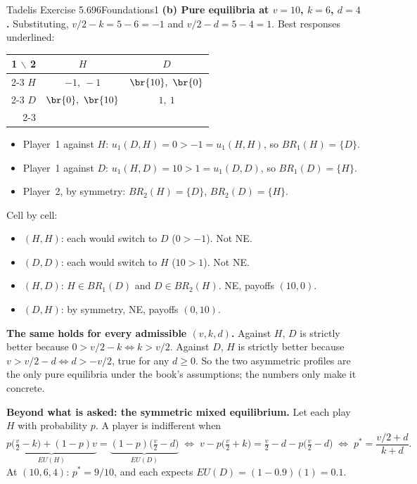 \begin{exsol}{Tadelis Exercise 5.6}{96}{Foundations}{1}
\textbf{(b) Pure equilibria at $v = 10$, $k = 6$, $d = 4$.} Substituting,
$v/2 - k = 5 - 6 = -1$ and $v/2 - d = 5 - 4 = 1$. Best responses underlined:
\begin{center}
\begin{tabular}{r|c|c|}
\multicolumn{1}{r}{1 $\backslash$ 2} & \multicolumn{1}{c}{$H$} & \multicolumn{1}{c}{$D$}\\ \cline{2-3}
$H$ & $-1,\ -1$ & $\br{10},\ \br{0}$ \\ \cline{2-3}
$D$ & $\br{0},\ \br{10}$ & $1,\ 1$ \\ \cline{2-3}
\end{tabular}
\end{center}
\begin{itemize}
  \item Player~1 against $H$: $u_1(D,H) = 0 > -1 = u_1(H,H)$, so $BR_1(H) = \{D\}$.
  \item Player~1 against $D$: $u_1(H,D) = 10 > 1 = u_1(D,D)$, so $BR_1(D) = \{H\}$.
  \item Player~2, by symmetry: $BR_2(H) = \{D\}$, $BR_2(D) = \{H\}$.
\end{itemize}
Cell by cell:
\begin{itemize}
  \item $(H,H)$: each would switch to $D$ ($0 > -1$). Not NE.
  \item $(D,D)$: each would switch to $H$ ($10 > 1$). Not NE.
  \item $(H,D)$: $H \in BR_1(D)$ and $D \in BR_2(H)$. NE, payoffs $(10, 0)$.
  \item $(D,H)$: by symmetry, NE, payoffs $(0, 10)$.
\end{itemize}

\textbf{The same holds for every admissible $(v,k,d)$.} Against $H$, $D$ is strictly better because
$0 > v/2 - k \iff k > v/2$. Against $D$, $H$ is strictly better because
$v > v/2 - d \iff d > -v/2$, true for any $d \ge 0$. So the two asymmetric profiles are the only
pure equilibria under the book's assumptions; the numbers only make it concrete.

\textbf{Beyond what is asked: the symmetric mixed equilibrium.} Let each play $H$ with probability
$p$. A player is indifferent when
\[
  \underbrace{p\big(\tfrac v2 - k\big) + (1-p)v}_{EU(H)} = \underbrace{(1-p)\big(\tfrac v2 - d\big)}_{EU(D)}
  \;\Longleftrightarrow\; v - p\big(\tfrac v2 + k\big) = \tfrac v2 - d - p\big(\tfrac v2 - d\big)
  \;\Longleftrightarrow\; p^* = \frac{v/2 + d}{k + d}.
\]
At $(10,6,4)$: $p^* = 9/10$, and each expects $EU(D) = (1 - 0.9)(1) = 0.1$.


\end{exsol}
